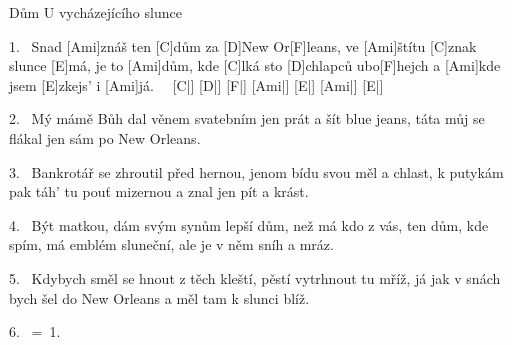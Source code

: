\begin{song}{Dům U vycházejícího slunce}{}

\begin{xverse}{1.~}
Snad [\large Ami]znáš ten [\large C]dům za [\large D]New Or[\large F]leans,
ve [\large Ami]{}štítu [\large C]znak slunce [\large E]má,
je to [\large Ami]dům, kde [\large C]lká sto [\large D]chlapců ubo[\large F]hejch
a [\large Ami]kde jsem [\large E]zkejs' i [\large Ami]já. \ \  [\large C|]{} [\large D|]{} [\large F|]{} [\large Ami|]{} [\large E|]{} [\large Ami|]{} [\large E|]{}
\end{xverse}

\begin{xverse}{2.~}
Mý mámě Bůh dal věnem svatebním
jen prát a šít blue jeans,
táta můj se flákal jen
sám po New Orleans.
\end{xverse}

\begin{xverse}{3.~}
Bankrotář se zhroutil před hernou,
jenom bídu svou měl a chlast,
k putykám pak táh' tu pouť mizernou
a znal jen pít a krást.
\end{xverse}

\begin{xverse}{4.~}
Být matkou, dám svým synům
lepší dům, než má kdo z vás,
ten dům, kde spím, má emblém sluneční,
ale je v něm sníh a mráz.
\end{xverse}

\begin{xverse}{5.~}
Kdybych směl se hnout z těch kleští,
pěstí vytrhnout tu mříž,
já jak v snách bych šel do New Orleans
a měl tam k slunci blíž.
\end{xverse}

\begin{xverse}{6.~}
=\ 1.
\end{xverse}

\end{song}


